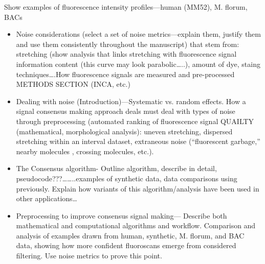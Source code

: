 Show examples of fluorescence intensity profiles—human (MM52), M. florum,  BACs
\begin{itemize}
\item Noise considerations (select a set of noise metrics—explain them, justify them and use them consistently throughout the manuscript) that stem from: stretching (show analysis that links stretching with fluorescence signal information content (this curve may look parabolic…..), amount of dye, staing techniques….How fluorescence signals are measured and pre-processed METHODS SECTION (INCA, etc.)
\item Dealing with noise (Introduction)—Systematic vs. random effects. How a signal consensus making approach deals must deal with types of noise through preprocessing (automated ranking of fluorescence signal QUAILTY (mathematical, morphological analysis): uneven stretching, dispersed stretching within an interval dataset, extraneous noise (“fluorescent garbage,” nearby molecules , crossing molecules, etc.). 
\item The Consensus algorithm- Outline algorithm, describe in detail, pseudocode???……..examples of synthetic data, data comparisons using previously. Explain how variants of this algorithm/analysis have been used in other applications…
\item Preprocessing to improve consensus signal making— Describe both mathematical and computational algorithms and workflow. Comparison and analysis of examples drawn from human, synthetic, M. florum, and BAC data, showing how more confident fluoroscans emerge from considered filtering. Use noise metrics to prove this point.
\end{itemize}



